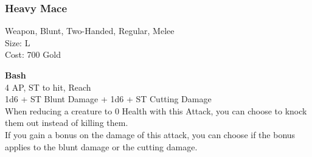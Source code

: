 \subsubsection{Heavy Mace}\label{weapon:heavyMace}
Weapon, Blunt, Two-Handed, Regular, Melee\\
Size: L\\
Cost: 700 Gold

\textbf{Bash}\\
4 AP, ST to hit,  Reach\\
1d6 + \texttimes ST Blunt Damage + 1d6 + \texttimes ST Cutting Damage\\
When reducing a creature to 0 Health with this Attack, you can choose to knock them out instead of killing them.\\
If you gain a bonus on the damage of this attack, you can choose if the bonus applies to the blunt damage or the cutting damage.